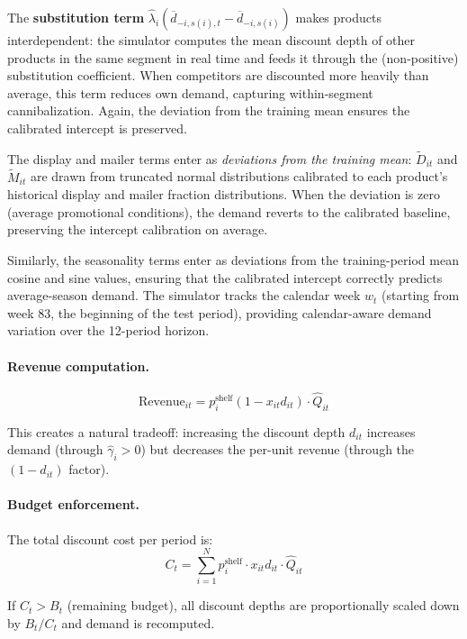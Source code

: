 \documentclass[12pt,a4paper]{article}
\begin{document}
The \textbf{substitution term}
$\hat{\lambda}_i (\overline{d}_{-i,s(i),t} -
\overline{d}_{-i,s(i)})$ makes products interdependent: the
simulator computes the mean discount depth of other products in the
same segment in real time and feeds it through the (non-positive)
substitution coefficient. When competitors are discounted more
heavily than average, this term reduces own demand, capturing
within-segment cannibalization. Again, the deviation from the
training mean ensures the calibrated intercept is preserved.

The display and mailer terms enter as \emph{deviations from the
training mean}: $\tilde{D}_{it}$ and $\tilde{M}_{it}$ are drawn from
truncated normal distributions calibrated to each product's
historical display and mailer fraction distributions. When the
deviation is zero (average promotional conditions), the demand
reverts to the calibrated baseline, preserving the intercept
calibration on average.

Similarly, the seasonality terms enter as deviations from the
training-period mean cosine and sine values, ensuring that the
calibrated intercept correctly predicts average-season demand. The
simulator tracks the calendar week $w_t$ (starting from week 83,
the beginning of the test period), providing calendar-aware demand
variation over the 12-period horizon.

\paragraph{Revenue computation.}
\begin{equation}
\text{Revenue}_{it} = p_i^{\text{shelf}} (1 - x_{it} d_{it})
\cdot \hat{Q}_{it}
\end{equation}

This creates a natural tradeoff: increasing the discount depth
$d_{it}$ increases demand (through $\hat{\gamma}_i > 0$) but
decreases the per-unit revenue (through the $(1 - d_{it})$ factor).

\paragraph{Budget enforcement.}
The total discount cost per period is:
\begin{equation}
C_t = \sum_{i=1}^{N} p_i^{\text{shelf}} \cdot x_{it} d_{it}
\cdot \hat{Q}_{it}
\end{equation}

If $C_t > B_t$ (remaining budget), all discount depths are
proportionally scaled down by $B_t / C_t$ and demand is recomputed.
\end{document}
